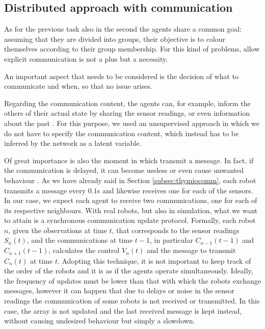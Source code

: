 \subsection{Distributed approach with communication}
\label{subsec:comm}

As for the previous task also in the second the agents share a common goal: 
assuming that they are divided into groups, their objective is to colour themselves 
according to their group membership. 
For this kind of problems, allow explicit communication is not a plus but a 
necessity.

An important aspect that needs to be considered is the decision of what to 
communicate and when, so that no issue arises.

Regarding the communication content, the agents can, for example, inform the 
others of their actual state by sharing the sensor readings, or even information 
about the past \cite[][]{guestrin2002coordinated, panait2005cooperative}.
For this purpose, we used an unsupervised approach in which we do not have to 
specify the communication content, which instead has to be inferred by the 
network as a latent variable.

Of great importance is also the moment in which transmit a message. In fact, if the 
communication is delayed, it can become useless or even cause unwanted 
behaviour \cite[][]{stone2000multiagent}.
As we have already said in Section \ref{subsec:thymiocomm}, each robot transmits 
a message every $0.1$\gls{s} and likewise receives one for each of the sensors. In 
our case, we expect each agent to receive two communications, one for each of its 
respective neighbours. With real robots, but also in simulation, what we want to 
attain is a synchronous communication update protocol. Formally, each robot 
$n$, given the observations at time $t$, that corresponds to the sensor readings 
$S_n(t)$, and the communications at time $t-1$, in particular $C_{n-1}(t-1)$ 
and $C_{n+1}(t-1)$, calculates the control $V_n(t)$ and the message to 
transmit $C_n(t)$ at time $t$. 
Adopting this technique, it is not important to keep track of the order of the 
robots and it is as if the agents operate simultaneously. 
Ideally, the frequency of updates must be lower than that with which the 
robots exchange messages, however it can happen that due to delays or 
noise in the sensor readings the communication of some robots is not 
received or transmitted. In this case, the array is not updated and the last 
received message is kept instead, without causing undesired behaviour but simply 
a slowdown.

